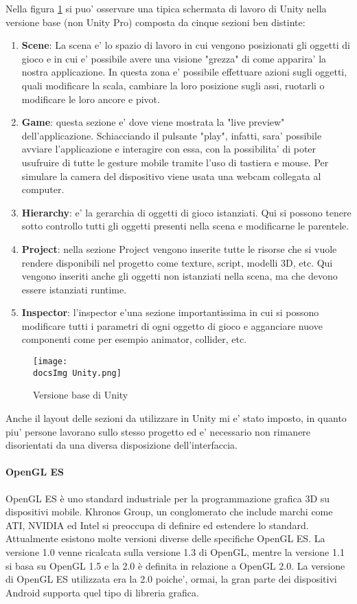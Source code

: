 Nella figura \ref{fig:Versione base di Unity} si puo' osservare una tipica schermata di lavoro di Unity nella versione base (non Unity Pro) composta da cinque sezioni ben distinte:
\begin{enumerate}
	\item \textbf{Scene}: La scena e' lo spazio di lavoro in cui vengono posizionati gli oggetti di gioco e in cui e' possibile avere una visione "grezza" di come apparira' la nostra applicazione. In questa zona e' possibile effettuare azioni sugli oggetti, quali modificare la scala, cambiare la loro posizione sugli assi, ruotarli o modificare le loro ancore e pivot.
	\item \textbf{Game}: questa sezione e' dove viene mostrata la "live preview" dell'applicazione. Schiacciando il pulsante "play", infatti, sara' possibile avviare l'applicazione e interagire con essa, con la possibilita' di poter usufruire di tutte le gesture mobile tramite l'uso di tastiera e mouse. Per simulare la camera del dispositivo viene usata una webcam collegata al computer.
	\item \textbf{Hierarchy}: e' la gerarchia di oggetti di gioco istanziati. Qui si possono tenere sotto controllo tutti gli oggetti presenti nella scena e modificarne le parentele.
	\item \textbf{Project}: nella sezione Project vengono inserite tutte le risorse che si vuole rendere disponibili nel progetto come texture, script, modelli 3D, etc. Qui vengono inseriti anche gli oggetti non istanziati nella scena, ma che devono essere istanziati runtime.
	\item \textbf{Inspector}: l'inspector e'una sezione importantissima in cui si possono modificare tutti i parametri di ogni oggetto di gioco e agganciare nuove componenti come per esempio animator, collider, etc.
\end{enumerate}

\begin{figure}[H]
	\centering
	\texttt{[image: \\docsImg Unity.png]}
	\caption{Versione base di Unity}
	\label{fig:Versione base di Unity}
\end{figure}

Anche il layout delle sezioni da utilizzare in Unity mi e' stato imposto, in quanto piu' persone lavorano sullo stesso progetto ed e' necessario non rimanere disorientati da una diversa disposizione dell'interfaccia.

\paragraph{OpenGL ES}
OpenGL ES è uno standard industriale per la programmazione grafica 3D su dispositivi mobile. Khronos Group, un conglomerato che include marchi come ATI, NVIDIA ed Intel si preoccupa di definire ed estendere lo standard.
Attualmente esistono molte versioni diverse delle specifiche OpenGL ES. La versione 1.0 venne ricalcata sulla versione 1.3 di OpenGL, mentre la versione 1.1 si basa su OpenGL 1.5 e la 2.0 è definita in relazione a OpenGL 2.0. La versione di OpenGL ES utilizzata era la 2.0 poiche', ormai, la gran parte dei dispositivi Android supporta quel tipo di libreria grafica.

